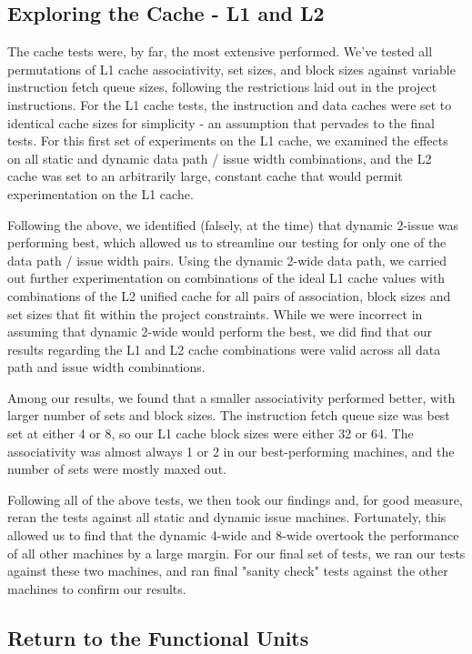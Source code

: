 \documentclass[paper=a4, fontsize=12pt]{scrartcl} %
\numberwithin{equation}{section} %
\numberwithin{figure}{section} %
\numberwithin{table}{section} %
\begin{document}
\subsection{Exploring the Cache - L1 and L2}

The cache tests were, by far, the most extensive performed. We've tested all permutations of L1 cache associativity, set sizes, and block sizes against variable instruction fetch queue sizes, following the restrictions laid out in the project instructions. For the L1 cache tests, the instruction and data caches were set to identical cache sizes for simplicity - an assumption that pervades to the final tests. For this first set of experiments on the L1 cache, we examined the effects on all static and dynamic data path / issue width combinations, and the L2 cache was set to an arbitrarily large, constant cache that would permit experimentation on the L1 cache.

Following the above, we identified (falsely, at the time) that dynamic 2-issue was performing best, which allowed us to streamline our testing for only one of the data path / issue width pairs. Using the dynamic 2-wide data path, we carried out further experimentation on combinations of the ideal L1 cache values with combinations of the L2 unified cache for all pairs of association, block sizes and set sizes that fit within the project constraints. While we were incorrect in assuming that dynamic 2-wide would perform the best, we did find that our results regarding the L1 and L2 cache combinations were valid across all data path and issue width combinations.

Among our results, we found that a smaller associativity performed better, with larger number of sets and block sizes. The instruction fetch queue size was best set at either 4 or 8, so our L1 cache block sizes were either 32 or 64. The associativity was almost always 1 or 2 in our best-performing machines, and the number of sets were mostly maxed out.

Following all of the above tests, we then took our findings and, for good measure, reran the tests against all static and dynamic issue machines. Fortunately, this allowed us to find that the dynamic 4-wide and 8-wide overtook the performance of all other machines by a large margin. For our final set of tests, we ran our tests against these two machines, and ran final "sanity check" tests against the other machines to confirm our results.


\subsection{Return to the Functional Units}
\end{document}
